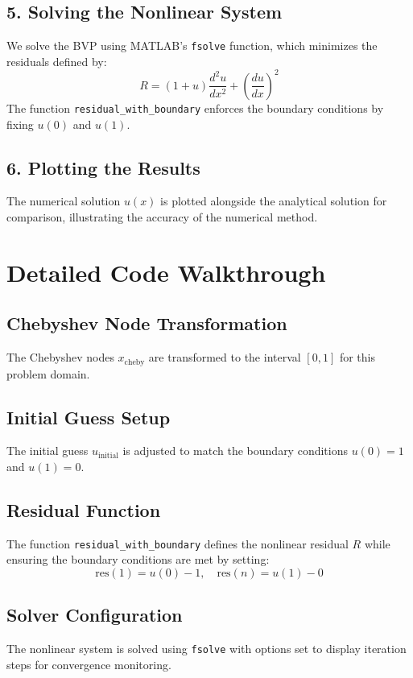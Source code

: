 \documentclass[12pt]{report} %
\begin{document}
\subsection*{5. Solving the Nonlinear System}
We solve the BVP using MATLAB's \texttt{fsolve} function, which minimizes the residuals defined by:
\[
R = (1 + u) \frac{d^2 u}{dx^2} + \left(\frac{du}{dx}\right)^2
\]
The function \texttt{residual\_with\_boundary} enforces the boundary conditions by fixing \( u(0) \) and \( u(1) \).

\subsection*{6. Plotting the Results}
The numerical solution \( u(x) \) is plotted alongside the analytical solution for comparison, illustrating the accuracy of the numerical method.

\section*{Detailed Code Walkthrough}

\subsection*{Chebyshev Node Transformation}
The Chebyshev nodes \( x_{\text{cheby}} \) are transformed to the interval \( [0, 1] \) for this problem domain.

\subsection*{Initial Guess Setup}
The initial guess \( u_{\text{initial}} \) is adjusted to match the boundary conditions \( u(0) = 1 \) and \( u(1) = 0 \).

\subsection*{Residual Function}
The function \texttt{residual\_with\_boundary} defines the nonlinear residual \( R \) while ensuring the boundary conditions are met by setting:
\[
\text{res}(1) = u(0) - 1, \quad \text{res}(n) = u(1) - 0
\]

\subsection*{Solver Configuration}
The nonlinear system is solved using \texttt{fsolve} with options set to display iteration steps for convergence monitoring.
\end{document}
